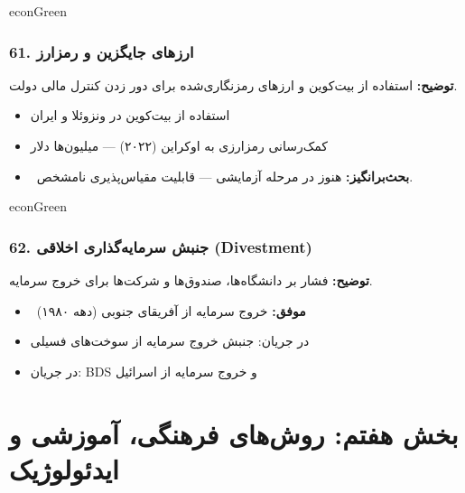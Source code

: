 \documentclass[a4paper,12pt]{article}
\newcommand{\success}[1]{\textcolor{greenPrimary}{\faCheckCircle\ \textbf{موفق:}} #1}
\newcommand{\debate}[1]{\textcolor{orangePrimary}{\faQuestionCircle\ \textbf{بحث‌برانگیز:}} #1}
\newcommand{\methodnum}[1]{\textcolor{purpleLight}{\textbf{#1.}}}
\begin{document}
\begin{methodcard}{econGreen}
\subsubsection{\methodnum{61} ارزهای جایگزین و رمزارز}
\textbf{توضیح:} استفاده از بیت‌کوین و ارزهای رمزنگاری‌شده برای دور زدن کنترل مالی دولت.

\begin{itemize}
  \item استفاده از بیت‌کوین در ونزوئلا و ایران
  \item کمک‌رسانی رمزارزی به اوکراین (۲۰۲۲) — میلیون‌ها دلار
\end{itemize}
\begin{itemize}[label=\textcolor{yellowPrimary}{\faExclamationTriangle}]
  \item \debate{هنوز در مرحله آزمایشی — قابلیت مقیاس‌پذیری نامشخص.}
\end{itemize}
\end{methodcard}

\begin{methodcard}{econGreen}
\subsubsection{\methodnum{62} جنبش سرمایه‌گذاری اخلاقی (Divestment)}
\textbf{توضیح:} فشار بر دانشگاه‌ها، صندوق‌ها و شرکت‌ها برای خروج سرمایه.

\begin{itemize}[label=\textcolor{greenPrimary}{\faCheckCircle}]
  \item \success{خروج سرمایه از آفریقای جنوبی (دهه ۱۹۸۰)}
\end{itemize}
\begin{itemize}
  \item در جریان: جنبش خروج سرمایه از سوخت‌های فسیلی
  \item در جریان: BDS و خروج سرمایه از اسرائیل
\end{itemize}
\end{methodcard}



\section{\textcolor{pinkPrimary}{\faTheaterMasks} بخش هفتم: روش‌های فرهنگی، آموزشی و ایدئولوژیک}
\end{document}

